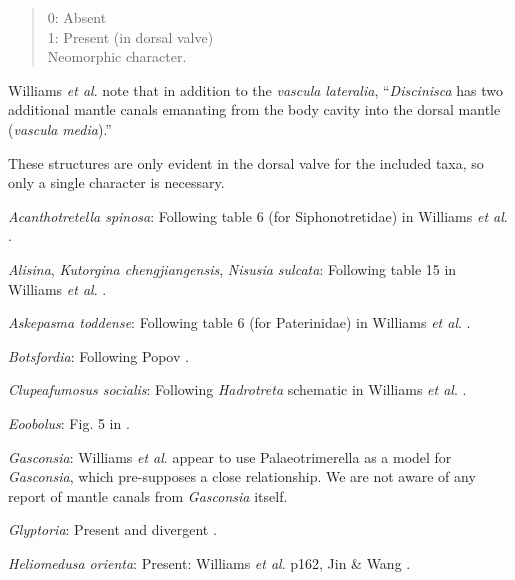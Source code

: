 \documentclass[openany]{book}
\theoremstyle{definition}
\theoremstyle{definition}
\theoremstyle{definition}
\theoremstyle{remark}
\begin{document}
\begin{quote}
0: Absent\\
1: Present (in dorsal valve)\\
Neomorphic character.
\end{quote}

Williams \emph{et al}. \citeyearpar{Williams1997Introduction} note that
in addition to the \emph{vascula} \emph{lateralia}, ``\emph{Discinisca}
has two additional mantle canals emanating from the body cavity into the
dorsal mantle (\emph{vascula} \emph{media}).''

These structures are only evident in the dorsal valve for the included
taxa, so only a single character is necessary.

\hypertarget{Acanthotretella_spinosa-coding-94}{}
\emph{Acanthotretella spinosa}: Following table 6 (for Siphonotretidae)
in Williams \emph{et al}.
\citeyearpar{Williams2000LinguliformeaCraniiformea}.

\hypertarget{Alisina-coding-94}{}
\emph{Alisina}, \emph{Kutorgina chengjiangensis}, \emph{Nisusia
sulcata}: Following table 15 in Williams \emph{et al}.
\citeyearpar{Williams2000LinguliformeaCraniiformea}.

\hypertarget{Askepasma_toddense-coding-94}{}
\emph{Askepasma toddense}: Following table 6 (for Paterinidae) in
Williams \emph{et al}.
\citeyearpar{Williams2000LinguliformeaCraniiformea}.

\hypertarget{Botsfordia-coding-94}{}
\emph{Botsfordia}: Following Popov \citeyearpar[fig.
2]{Popov1992TheCambrian}.

\hypertarget{Clupeafumosus_socialis-coding-94}{}
\emph{Clupeafumosus socialis}: Following \emph{Hadrotreta} schematic in
Williams \emph{et al}.
\citeyearpar{Williams2000LinguliformeaCraniiformea}.

\hypertarget{Eoobolus-coding-94}{}
\emph{Eoobolus}: Fig. 5 in \citet{Balthasar2009Thebrachiopod}.

\hypertarget{Gasconsia-coding-94}{}
\emph{Gasconsia}: Williams \emph{et al}. \citeyearpar[table
15]{Williams2000LinguliformeaCraniiformea} appear to use
Palaeotrimerella \citep[as drawn in][]{Williams1997Introduction} as a
model for \emph{Gasconsia}, which pre-supposes a close relationship. We
are not aware of any report of mantle canals from \emph{Gasconsia}
itself.

\hypertarget{Glyptoria-coding-94}{}
\emph{Glyptoria}: Present and divergent
\citep{Williams2000LinguliformeaCraniiformea}.

\hypertarget{Heliomedusa_orienta-coding-94}{}
\emph{Heliomedusa orienta}: Present: Williams \emph{et al}.
\citeyearpar{Williams2000LinguliformeaCraniiformea} p162, Jin \& Wang
\citeyearpar{Jin1992Revisionof}.
\end{document}

